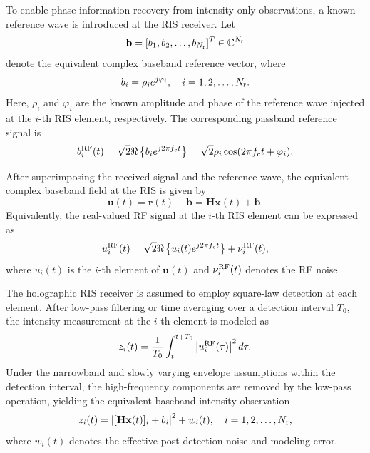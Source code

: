 \documentclass[journal]{IEEEtran}
\begin{document}
To enable phase information recovery from intensity-only observations, a known reference wave is introduced at the RIS receiver. 
Let
\begin{equation}
\mathbf{b}
=
[b_1,b_2,\ldots,b_{N_{\rm r}}]^T
\in\mathbb{C}^{N_{\rm r}}
\end{equation}
denote the equivalent complex baseband reference vector, where
\begin{equation}
b_i
=
\rho_i e^{j\varphi_i},
\quad
i=1,2,\ldots,N_{\rm r}.
\label{eq:reference_baseband}
\end{equation}
Here, $\rho_i$ and $\varphi_i$ are the known amplitude and phase of the reference wave injected at the $i$-th RIS element, respectively. 
The corresponding passband reference signal is
\begin{equation}
b_i^{\rm RF}(t)
=
\sqrt{2}\Re\left\{
b_i e^{j2\pi f_c t}
\right\}
=
\sqrt{2}\rho_i\cos(2\pi f_c t+\varphi_i).
\label{eq:reference_passband}
\end{equation}

After superimposing the received signal and the reference wave, the equivalent complex baseband field at the RIS is given by
\begin{equation}
\mathbf{u}(t)
=
\mathbf{r}(t)+\mathbf{b}
=
\mathbf{H}\mathbf{x}(t)+\mathbf{b}.
\label{eq:combined_baseband_field}
\end{equation}
Equivalently, the real-valued RF signal at the $i$-th RIS element can be expressed as
\begin{equation}
u_i^{\rm RF}(t)
=
\sqrt{2}\Re\left\{
u_i(t)e^{j2\pi f_c t}
\right\}
+
\nu_i^{\rm RF}(t),
\label{eq:combined_rf_signal}
\end{equation}
where $u_i(t)$ is the $i$-th element of $\mathbf{u}(t)$ and $\nu_i^{\rm RF}(t)$ denotes the RF noise.

The holographic RIS receiver is assumed to employ square-law detection at each element. 
After low-pass filtering or time averaging over a detection interval $T_0$, the intensity measurement at the $i$-th element is modeled as
\begin{equation}
z_i(t)
=
\frac{1}{T_0}
\int_{t}^{t+T_0}
\left|u_i^{\rm RF}(\tau)\right|^2 d\tau.
\label{eq:square_law_integral}
\end{equation}
Under the narrowband and slowly varying envelope assumptions within the detection interval, the high-frequency components are removed by the low-pass operation, yielding the equivalent baseband intensity observation
\begin{equation}
z_i(t)
=
\left|
[\mathbf{H}\mathbf{x}(t)]_i+b_i
\right|^2
+
w_i(t),
\quad
i=1,2,\ldots,N_{\rm r},
\label{eq:elementwise_intensity}
\end{equation}
where $w_i(t)$ denotes the effective post-detection noise and modeling error.
\end{document}
